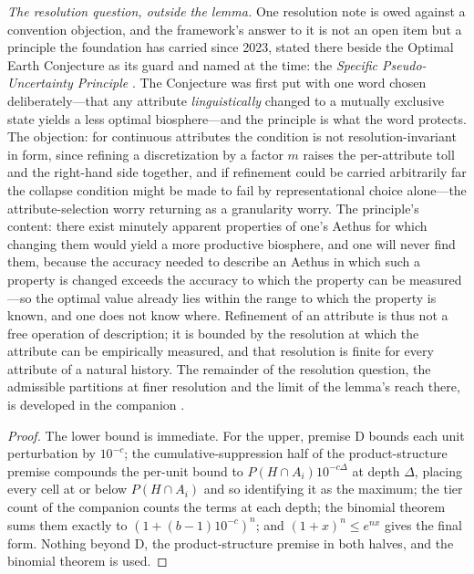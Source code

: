 \documentclass[11pt]{article}
\theoremstyle{definition}
\begin{document}
\noindent\textit{The resolution question, outside the lemma.} One resolution note is owed against a convention objection, and the framework's answer to it is not an open item but a principle the foundation has carried since 2023, stated there beside the Optimal Earth Conjecture as its guard and named at the time: the \emph{Specific Pseudo-Uncertainty Principle} \cite{Nexus}. The Conjecture was first put with one word chosen deliberately---that any attribute \emph{linguistically} changed to a mutually exclusive state yields a less optimal biosphere---and the principle is what the word protects. The objection: for continuous attributes the condition is not resolution-invariant in form, since refining a discretization by a factor $m$ raises the per-attribute toll and the right-hand side together, and if refinement could be carried arbitrarily far the collapse condition might be made to fail by representational choice alone---the attribute-selection worry returning as a granularity worry. The principle's content: there exist minutely apparent properties of one's Aethus for which changing them would yield a more productive biosphere, and one will never find them, because the accuracy needed to describe an Aethus in which such a property is changed exceeds the accuracy to which the property can be measured---so the optimal value already lies within the range to which the property is known, and one does not know where. Refinement of an attribute is thus not a free operation of description; it is bounded by the resolution at which the attribute can be empirically measured, and that resolution is finite for every attribute of a natural history. The remainder of the resolution question, the admissible partitions at finer resolution and the limit of the lemma's reach there, is developed in the companion \cite{Nexus}.




\begin{proof}
The lower bound is immediate. For the upper, premise D bounds each unit perturbation by $10^{-c}$; the cumulative-suppression half of the product-structure premise compounds the per-unit bound to $P(H \cap A_i)10^{-c\Delta}$ at depth $\Delta$, placing every cell at or below $P(H \cap A_i)$ and so identifying it as the maximum; the tier count of the companion \cite{Nexus} counts the terms at each depth; the binomial theorem sums them exactly to $(1 + (b-1)10^{-c})^{n}$; and $(1+x)^n \le e^{nx}$ gives the final form. Nothing beyond D, the product-structure premise in both halves, and the binomial theorem is used.
\end{proof}
\end{document}
